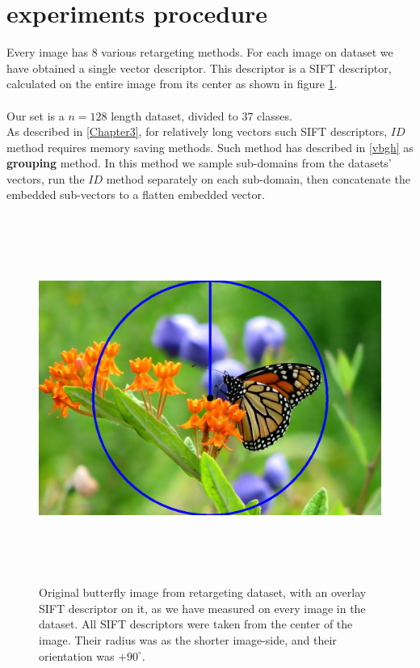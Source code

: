 \section{experiments procedure}

Every image has 8 various retargeting methods. For each image on dataset we have obtained a single vector descriptor. This descriptor is a SIFT descriptor, calculated on the entire image from its center as shown in figure \ref{single_sift}. 
\\ \\ 
Our set is a $n=128$ length dataset, divided to $37$ classes.\\
As described in \ref{Chapter3}, for relatively long vectors such SIFT descriptors, $ID$ method requires memory saving methods. Such method has described in \ref{vbgh} as \textbf{grouping} method. In this method we sample sub-domains from the datasets' vectors, run the $ID$ method separately on each sub-domain, then concatenate the embedded sub-vectors to a flatten embedded vector. \\ 



\begin{figure}[h] \label{single_sift}
	
	\includegraphics[width=\linewidth,height=12cm,keepaspectratio]{Figures/butterfly_sift}
	\caption[image single sift descriptor]
	{Original butterfly image from retargeting dataset, with an overlay SIFT descriptor on it, as we have measured on every image in the dataset. All SIFT descriptors were taken from the center of the image. Their radius was as the shorter image-side, and their orientation was $+90^{\circ}$.}
	
\end{figure}

